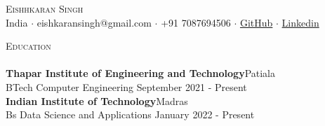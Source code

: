 \documentclass[a4paper]{article}
\newcommand{\lineunder} {
    \vspace*{-8pt} \\
    \hspace*{-18pt} \hrulefill \\
}
\newcommand{\header} [1] {
    {\hspace*{-18pt}\vspace*{6pt} \textsc{#1}}
    \vspace*{-6pt} \lineunder
}
\begin{document}
\vspace*{-40pt}

    

\vspace*{-9pt}
\begin{center}
	{\Huge \scshape {Eishhkaran Singh}}\\
	\vspace{1mm}
	India $\cdot$ eishkaransingh@gmail.com $\cdot$ +91 7087694506 $\cdot$ \href{https://github.com/EISHKARAN}{GitHub} $\cdot$ \href{https://www.linkedin.com/in/eishkaran-singh/}{Linkedin} \\
\end{center}

\vspace{0.25mm}
\header{Education}
\vspace{0mm}
\textbf{Thapar Institute of Engineering and Technology}\hfill Patiala\\
BTech Computer  Engineering \hfill September 2021 - Present\\
\vspace{0.5mm}
\textbf{Indian Institute of Technology}\hfill Madras\\
Bs Data Science and Applications \hfill January 2022 - Present\\
\vspace{1mm}

 

\end{document}
